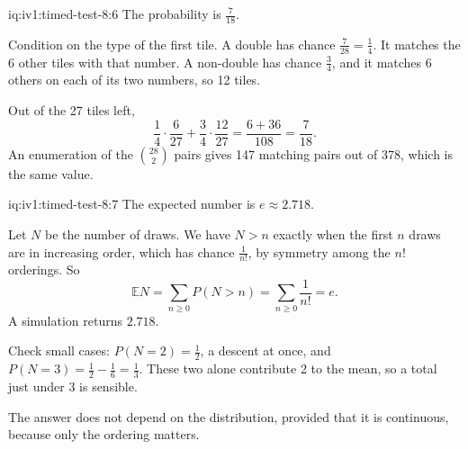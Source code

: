 \begin{solution}{iq:iv1:timed-test-8:6}
The probability is $\frac{7}{18}$.

Condition on the type of the first tile. A double has chance $\frac{7}{28} = \frac14$. It matches the 6 other tiles with that number. A non-double has chance $\frac34$, and it matches 6 others on each of its two numbers, so 12 tiles.

Out of the 27 tiles left,
\[
\frac14 \cdot \frac{6}{27} + \frac34 \cdot \frac{12}{27} = \frac{6 + 36}{108} = \frac{7}{18}.
\]
An enumeration of the $\binom{28}{2}$ pairs gives 147 matching pairs out of 378, which is the same value.

\end{solution}

\begin{solution}{iq:iv1:timed-test-8:7}
The expected number is $e \approx 2.718$.

Let $N$ be the number of draws. We have $N > n$ exactly when the first $n$ draws are in increasing order, which has chance $\frac{1}{n!}$, by symmetry among the $n!$ orderings. So
\[
\mathbb{E}N = \sum_{n \ge 0}P(N > n) = \sum_{n \ge 0}\frac{1}{n!} = e.
\]
A simulation returns $2.718$.

Check small cases: $P(N = 2) = \frac12$, a descent at once, and $P(N = 3) = \frac12 - \frac16 = \frac13$. These two alone contribute 2 to the mean, so a total just under 3 is sensible.

The answer does not depend on the distribution, provided that it is continuous, because only the ordering matters.

\end{solution}

